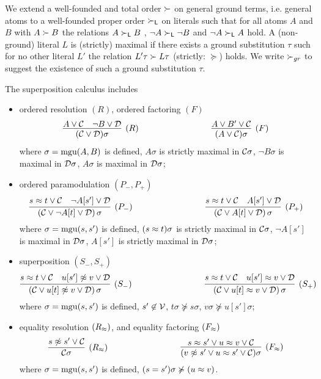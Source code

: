 \begin{definition}\label{def:orders-on-literals}
	We extend a well-founded and total order $\succ$ on general ground terms, i.e. general atoms 
	to a well-founded proper order $\succ_{\mathsf L}$ on literals such that for all atoms $A$ and $B$ with $A\succ B$ 
	the relations $A\succ_{\mathsf L} B$ , 
	$\lnot A\succ_{\mathsf L}\lnot B$ and 
	$\lnot A\succ_{\mathsf L} A$ hold. 
	A (non-ground) literal $L$ is {\myem (strictly) maximal} if there exists a ground substitution $\tau$ 
	such for no other literal $L'$ the relation $L'\tau\succ L\tau$ (strictly: $\succcurlyeq$) holds.
	We write $\succ_{gr}$ to suggest the existence of such a ground substitution $\tau$.
\end{definition}
\begin{definition}\label{def:superposition-calculus}
	The {\myem superposition calculus} includes
	\begin{itemize}
		\item ordered resolution $(R)$,
		ordered factoring $(F)$
		\begin{gather*}
		\infer
		[(R)]
		{(\mcC \lor \mcD)\sigma}
		{{ A} \lor\mcC & { \lnot B} \lor\mcD}
		\hspace{3cm}
		\infer
		[(F)]
		{(A \lor \mcC)\sigma}
		{{ A}\lor B'\lor\mcC}
		\end{gather*}
		where
		$\sigma=\operatorname{mgu}(A,B)$ is defined, 
		$A\sigma$ { is strictly maximal} in ${\mathcal C}\sigma$,
		$\lnot B\sigma$ { is maximal} in ${\mathcal D}\sigma$, 
		$A\sigma$ is maximal in ${\mathcal D}\sigma$;
		\item ordered paramodulation $(P_-,P_+)$
		\[
		\infer
		[(P_-)]
		{(\mcC\lor \lnot A[t]\lor\mcD)\,\sigma}
		{{ s\mEQ t} \lor\mcC\quad { \lnot A[s']}\lor\mcD}
		\hspace{3cm}
		\infer
		[(P_+)]
		{(\mcC\lor A[t]\lor\mcD)\,\sigma}
		{{ s\mEQ t} \lor\mcC\quad { A[s']}\lor\mcD}
		\]
		where $\sigma=\operatorname{mgu}(s,s')$ is defined, 
		$(s\approx t)\sigma$ { is strictly maximal} in ${\mathcal C}\sigma$, 
		$\lnot A[s']$ { is maximal} in ${\mathcal D}\sigma$,
		$A[s']$ { is strictly maximal} in ${\mathcal D}\sigma$;
		\item superposition $(S_-,S_+)$
		\[
		\infer
		[(S_-)]
		{(\mcC\lor u[t]\mNE v\lor\mcD)\,\sigma}
		{{ s\mEQ t}\lor\mcC\quad { u[s']\mNE v}\lor\mcD}
		\hspace{3cm}
		\infer
		[(S_+)]
		{(\mcC\lor u[t]\mEQ v\lor\mcD)\,\sigma}
		{{ s\mEQ t}\lor\mcC\quad { u[s']\mEQ v}\lor\mcD}
		\]
		where $\sigma=\operatorname{mgu}(s,s')$ is defined,
		$s'\not\in{\mathcal V}$, 
		$t\sigma\not\succcurlyeq s\sigma$,
		$v\sigma\not\succcurlyeq u[s']\sigma$;
		\item 
		equality resolution $(R_\approx )$,
		and equality factoring $(F_\approx )$
		\[
		\infer
		[(R_\mEQ)]
		{\mcC\sigma}
		{{ s\mNE s'}\lor\mcC}
		\hspace{3cm}
		\infer
		[(F_\mEQ)]
		{(v\mNE s'\lor u\mEQ s'\lor\mcC)\sigma}
		{{s\mEQ s'}\lor { u\mEQ v}\lor\mcC}
		\]
		where 
		$\sigma=\operatorname{mgu}(s,s')$ is defined,
		$(s=s')\sigma\not\succcurlyeq(u\approx v)$.
	\end{itemize}
\end{definition}

